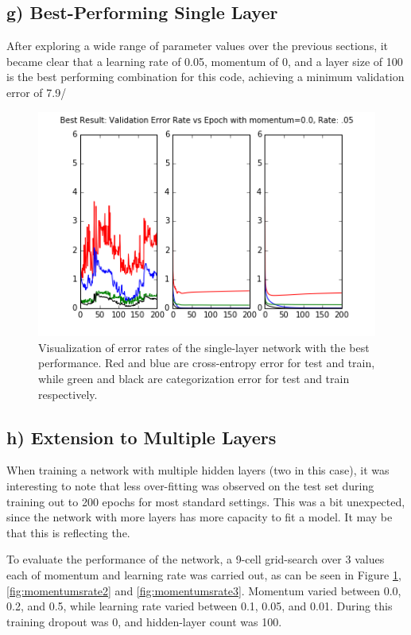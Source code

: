 \documentclass{article}
\begin{document}
\subsection{g) Best-Performing Single Layer}

After exploring a wide range of parameter values over the previous sections, it became clear that a learning rate of 0.05, momentum of 0, and a layer size of 100 is the best performing combination for this code, achieving a minimum validation error of 7.9/%


\begin{figure}[h]
  \centering
  \includegraphics[scale=0.6]{../one_layer_best.png} 
  \caption{Visualization of error rates of the single-layer network with the best performance. Red and blue are cross-entropy error for test and train, while green and black are categorization error for test and train respectively. }
  \label{fig:momentumsrate1}
\end{figure}


\subsection{h) Extension to Multiple Layers}

When training a network with multiple hidden layers (two in this case), it was interesting to note that less over-fitting was observed on the test set during training out to 200 epochs for most standard settings.  This was a bit unexpected, since the network with more layers has more capacity to fit a model.  It may be that this is reflecting the. 

To evaluate the performance of the network, a 9-cell grid-search over 3 values each of momentum and learning rate was carried out, as can be seen in Figure \ref{fig:momentumsrate1}, \ref{fig:momentumsrate2} and \ref{fig:momentumsrate3}. Momentum varied between 0.0, 0.2, and 0.5, while learning rate varied between 0.1, 0.05, and 0.01. During this training dropout was 0, and hidden-layer count was 100. 
\end{document}

